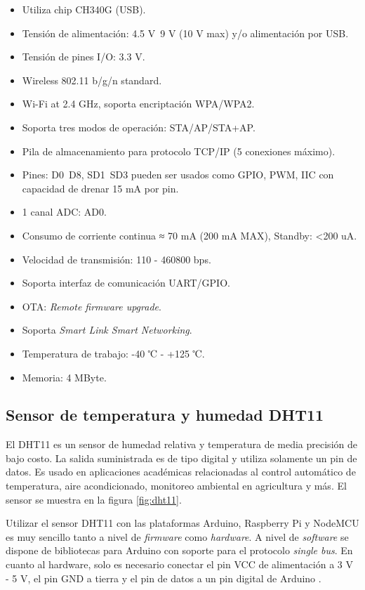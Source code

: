\begin{itemize}
\item Utiliza chip CH340G (USB).
\item Tensión de alimentación: 4.5 V~9 V (10 V max) y/o alimentación por USB.
\item Tensión de pines I/O: 3.3 V.
\item Wireless 802.11 b/g/n standard.
\item Wi-Fi at 2.4 GHz, soporta encriptación WPA/WPA2.
\item Soporta tres modos de operación: STA/AP/STA+AP.
\item Pila de almacenamiento para protocolo TCP/IP (5 conexiones máximo).
\item Pines: D0~D8, SD1~SD3 pueden ser usados como GPIO, PWM, IIC con capacidad de drenar 15 mA por pin.
\item 1 canal ADC: AD0.
\item Consumo de corriente continua ≈ 70 mA (200 mA MAX), Standby: <200 uA.
\item Velocidad de transmisión: 110 - 460800 bps.
\item Soporta interfaz de comunicación UART/GPIO.
\item OTA: \emph{Remote firmware upgrade}.
\item Soporta \emph{Smart Link Smart Networking}.
\item Temperatura de trabajo: -40 ℃ - +125 ℃.
\item Memoria: 4 MByte.
\end{itemize}

\subsection{Sensor de temperatura y humedad DHT11}

El DHT11 es un sensor de humedad relativa y temperatura de media precisión de bajo costo. La salida suministrada es de tipo digital y utiliza solamente un pin de datos. Es usado en aplicaciones académicas relacionadas al control automático de temperatura, aire acondicionado, monitoreo ambiental en agricultura y más. El sensor se muestra en la figura \ref{fig:dht11}.

Utilizar el sensor DHT11 con las plataformas Arduino, Raspberry Pi y NodeMCU es muy sencillo tanto a nivel de \emph{firmware} como \emph{hardware}. A nivel de \emph{software} se dispone de bibliotecas para Arduino con soporte para el protocolo \emph{single bus}. En cuanto al hardware, solo es necesario conectar el pin VCC de alimentación a 3 V - 5 V, el pin GND a tierra y el pin de datos a un pin digital de Arduino \citep{WEBSITE:8}. 

